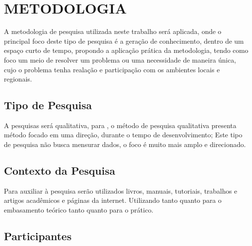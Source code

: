 \chapter{METODOLOGIA}


%


\par A metodologia de pesquisa utilizada neste trabalho será aplicada, onde o
principal foco deste tipo de pesquisa é a geração de conhecimento, dentro de um
espaço curto de tempo, propondo a aplicação prática da metodologia, tendo como
foco um meio de resolver um problema ou uma necessidade de maneira única, cujo o
problema tenha realação e participação com os ambientes locais e regionais.


		

\section{Tipo de Pesquisa}

\par A pesquisas será qualitativa, para , o
método de pesquisa qualitativa presenta método focado em uma direção, durante o
tempo de desenvolvimento; Este tipo de pesquisa não busca mensurar dados, o foco
é muito mais amplo e direcionado.


\section{Contexto da Pesquisa}


\par Para auxiliar à pesquisa serão utilizados livros, manuais, tutoriais,
trabalhos e artigos acadêmicos e páginas da internet. Utilizando tanto quanto 
para o embasamento teórico tanto quanto para o prático.



\section{Participantes}

